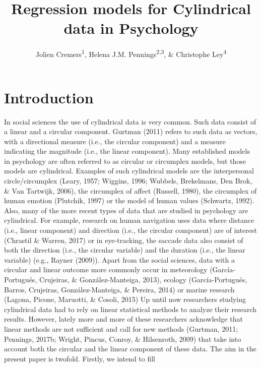 \documentclass[man]{apa6}
\title{Regression models for Cylindrical data in Psychology}
\author{Jolien Cremers\textsuperscript{1}, Helena J.M. Pennings\textsuperscript{2,3}, \& Christophe Ley\textsuperscript{4}}
\date{}
\affiliation{
\vspace{0.5cm}
\textsuperscript{1} Department of Methodology and Statistics, Utrecht University\\\textsuperscript{2} TNO\\\textsuperscript{3} Department of Education, Utrecht University\\\textsuperscript{4} Department of Applied Mathematics, Computer Science and Statistics, Ghent University}
\DeclareRobustCommand{\VAN}[3]{#2}
\DeclareRobustCommand{\DEN}[3]{#2}
\begin{document}
\maketitle

\section{Introduction}\label{Introduction}

In social sciences the use of cylindrical data is very common. Such data consist
of a linear and a circular component. Gurtman (2011) refers to such data
as vectors, with a directional measure (i.e., the circular component) and a
measure indicating the magnitude (i.e., the linear component). Many established
models in psychology are often referred to as circular or circumplex models, but
those models are cylindrical. Examples of such cylindrical models are the
interpersonal circle/circumplex
(Leary, 1957; Wiggins, 1996; Wubbels, Brekelmans, \DEN{Brok}{Den}{den} Brok, \& \VAN{Tartwijk}{Van}{van} Tartwijk, 2006), the circumplex of
affect (Russell, 1980), the circumplex of human emotion
(Plutchik, 1997) or the model of human values (Schwartz, 1992).
\newline
\indent Also, many of the more recent types of data that are studied in psychology are
cylindrical. For example, research on human navigation uses data where distance
(i.e., linear component) and direction (i.e., the circular component) are of
interest (Chrastil \& Warren, 2017) or in eye-tracking, the saccade data also
consist of both the direction (i.e., the circular variable) and the duration
(i.e., the linear variable) (e.g., Rayner (2009)). Apart from the social
sciences, data with a circular and linear outcome more commonly occur in
meteorology (García-Portugués, Crujeiras, \& González-Manteiga, 2013), ecology (García-Portugués, Barros, Crujeiras, González-Manteiga, \& Pereira, 2014) or
marine research (Lagona, Picone, Maruotti, \& Cosoli, 2015)
\newline
\indent Up until now researchers studying cylindrical data had to rely on linear
statistical methods to analyze their research results. However, lately more and more
of these researchers acknowledge that linear methods are not sufficient and call
for new methods (Gurtman, 2011; Pennings, 2017b; Wright, Pincus, Conroy, \& Hilsenroth, 2009) that take into account both the circular and the linear
component of these data.
\newline
\indent The aim in the present paper is twofold. Firstly, we intend to fill
\end{document}

